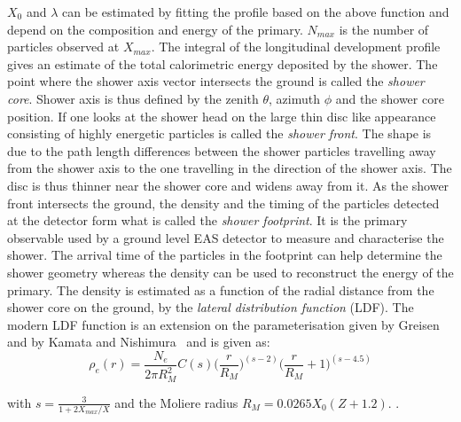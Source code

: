 $X_0$ and $\lambda$ can be estimated by fitting the profile based on the above function and depend on the composition and energy of the primary. $N_{max}$ is the number of particles observed at $X_{max}$. The integral of the longitudinal development profile gives an estimate of the total calorimetric energy deposited by the shower. 
The point where the shower axis vector intersects the ground is called the \textit{shower core}. Shower axis is thus defined by the zenith $\theta$, azimuth $\phi$ and the shower core position. If one looks at the shower head on the large thin disc like appearance consisting of highly energetic particles is called the \textit{shower front}. The shape is due to the path length differences between the shower particles travelling away from the shower axis to the one travelling in the direction of the shower axis. The disc is thus thinner near the shower core and widens away from it. As the shower front intersects the ground, the density and the timing of the particles detected at the detector form what is called the \textit{shower footprint}. It is the primary observable used by a ground level EAS detector to measure and characterise the shower. The arrival time of the particles in the footprint can help determine the shower geometry whereas the density can be used to reconstruct the energy of the primary. The density is estimated as a function of the radial distance from the shower core on the ground, by the \textit{lateral distribution function} (LDF). The modern LDF function is an extension on the parameterisation given by Greisen~\cite{annurev:/content/journals/10.1146/annurev.ns.10.120160.000431} and by Kamata and Nishimura~\cite{10.1143/PTPS.6.93} and is given as:
\begin{equation}
    \label{eq:Lateral_dist_func}
    \rho_e(r) = \frac{N_e}{2 \pi R_M^2} C(s) \biggl(\frac{r}{R_M}\biggr)^{(s-2)}\biggl(\frac{r}{R_M}+1\biggr)^{(s-4.5)}
\end{equation}

with $s = \frac{3}{1+2 X_{max}/X}$ and the Moliere radius $R_M = 0.0265 X_0(Z + 1.2)$. . 


